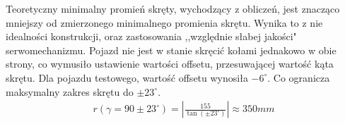             Teoretyczny minimalny promień skręty, wychodzący z obliczeń, jest znacząco mniejszy od zmierzonego minimalnego promienia skrętu.
            Wynika to z nie idealności konstrukcji, oraz zastosowania ,,względnie słabej jakości" serwomechanizmu.
            Pojazd nie jest w stanie skręcić kołami jednakowo w obie strony, co wymusiło ustawienie wartości offsetu, przesuwającej wartość kąta skrętu.
            Dla pojazdu testowego, wartość offsetu wynosiła $-6^\circ$. 
            Co ogranicza maksymalny zakres skrętu do $\pm 23^\circ$.
            \begin{gather}
                r(\gamma = 90 \pm 23^\circ) = \left|\frac{155}{\tan(\pm 23^\circ)}\right| \approx 350mm
            \end{gather}



        
